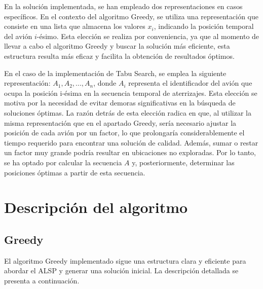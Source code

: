 \documentclass[letter, 10pt]{article}
\begin{document}
En la soluci\'on implementada, se han empleado dos representaciones en casos espec\'ificos. En el contexto del algoritmo Greedy, se utiliza una representaci\'on que consiste en una lista que almacena los valores $x_i$, indicando la posici\'on temporal del avi\'on $i$-\'esimo. Esta elecci\'on se realiza por conveniencia, ya que al momento de llevar a cabo el algoritmo Greedy y buscar la soluci\'on m\'as eficiente, esta estructura resulta m\'as eficaz y facilita la obtenci\'on de resultados \'optimos.


En el caso de la implementaci\'on de Tabu Search, se emplea la siguiente representaci\'on: $A_1, A_2, ..., A_n$, donde $A_i$ representa el identificador del avi\'on que ocupa la posici\'on i-\'esima en la secuencia temporal de aterrizajes. Esta elecci\'on se motiva por la necesidad de evitar demoras significativas en la b\'usqueda de soluciones \'optimas. La raz\'on detr\'as de esta elecci\'on radica en que, al utilizar la misma representaci\'on que en el apartado Greedy, ser\'ia necesario ajustar la posici\'on de cada avi\'on por un factor, lo que prolongar\'ia considerablemente el tiempo requerido para encontrar una soluci\'on de calidad. Adem\'as, sumar o restar un factor muy grande podr\'ia resultar en ubicaciones no exploradas. Por lo tanto, se ha optado por calcular la secuencia $A$ y, posteriormente, determinar las posiciones \'optimas a partir de esta secuencia.


\section{Descripci\'on del algoritmo}
\begin{comment}
C\'omo fue implementada la soluci\'on. Interesa la implementaci\'on particular m\'as que el algoritmo gen\'erico, es decir, si se tiene que implementar SA, lo que se espera es que se explique en pseudoc\'odigo la estructura
general y en p\'arrafos explicativos c\'omo fue implementada cada parte para su problema particular. Si
se utilizan operadores/movimientos se debe justificar por qu\'e se utilizaron dichos operadores/movimientos. 
En caso de una t\'ecnica completa, describir detalles relevantes del proceso, si se utiliza recursi\'on o no, explicar c\'omo se van construyendo soluciones, cu\'ando se revisan restricciones, c\'omo se registran conflictos, etc. En este punto no se espera que se incluya c\'odigo, eso va aparte.
\end{comment}
\subsection{Greedy}
El algoritmo Greedy implementado sigue una estructura clara y eficiente para abordar el ALSP y generar una soluci\'on inicial. La descripci\'on detallada se presenta a continuaci\'on.
\end{document}
